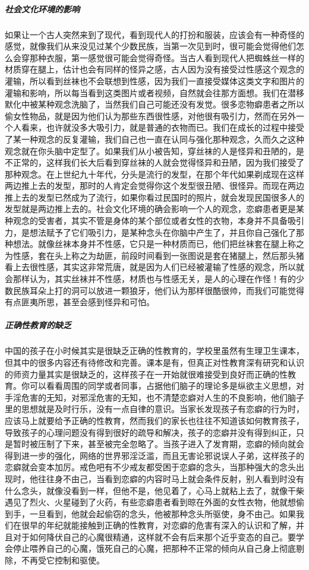 \subparagraph{社会文化环境的影响}

如果让一个古人突然来到了现代，看到现代人的打扮和服装，应该会有一种奇怪的感觉，就像我们从来没见过某个少数民族，当第一次见到时，很可能会觉得他们怎么会穿那种衣服，第一感觉很可能会觉得奇怪。当古人看到现代人把蜘蛛丝一样的材质穿在腿上，估计也会有同样的怪异之感，古人因为没有接受过性感这个观念的灌输，所以看到丝袜也不会联想到性感，因为我们一直接受媒体这类文字和图片的灌输和影响，所以每当看到这类图片或者视频，自然就会往那方面想。我们在潜移默化中被某种观念洗脑了，当然我们自己可能还没有发觉。很多恋物癖患者之所以偷女性物品，就是因为他们认为那些东西很性感，对他很有吸引力，然而在另外一个人看来，也许就没多大吸引力，就是普通的衣物而已。我们在成长的过程中接受了某一种观念的反复灌输，我们自己也一直在认同与强化那种观念，久而久之这种观念就在你头脑中定型了。如果我们从小被告知，穿丝袜的人是怪异和丑陋的，是不正常的，这样我们长大后看到穿丝袜的人就会觉得怪异和丑陋，因为我们接受了那种观念。在上世纪九十年代，分头是流行的发型，在那个年代如果剃成现在这样两边推上去的发型，那时的人肯定会觉得你这个发型很丑陋、很怪异。而现在两边推上去的发型已然成为了流行，如果你看过民国时的照片，就会发现民国很多人的发型就是两边推上去的。社会文化环境的确会影响一个人的观念，恋癖患者更是某种观念的受害者，其实不管是身体的某个部位或者女性的衣物，本身并不具备吸引力，是想法赋予了它们吸引力，是某种念头在你脑中产生了，并且你自己强化了那种想法。就像丝袜本身并不性感，它只是一种材质而已，他们把丝袜套在腿上称之为性感，套在头上称之为劫匪，前段时间看到一张图说是套在猪腿上，然后那头猪看上去很性感，其实这非常荒唐，就是因为人们已经被灌输了性感的观念，所以就会那样认为，其实丝袜并不性感，材质也与性感无关，是人的心理在作怪！有的少数民族耳朵上打的洞可以放进一颗狼牙，他们认为那样很酷很帅，而我们可能觉得有点匪夷所思，甚至会感到怪异和可怕。

\subparagraph{正确性教育的缺乏}

中国的孩子在小时候其实是很缺乏正确的性教育的，学校里虽然有生理卫生课本，但其中的很多内容还有待修改和完善。课本是有，但真正对性教育深有研究和认识的师资力量其实是很缺乏的，这样孩子在一开始就很难接受到良好而正确的性教育。你可以看看周围的同学或者同事，占据他们脑子的理论多是纵欲主义思想，对手淫危害的无知，对邪淫危害的无知，也不清楚恋癖对人生的不良影响，他们脑子里的思想就是及时行乐，没有一点自律的意识。当家长发现孩子有恋癖的行为时，应该马上就要给予正确的性教育，然而我们的家长也往往不知道该如何教育孩子，导致孩子的心理问题没有得到很好的疏导和解决，孩子的恋癖并没有得到纠正，只是暂时被压制了下来，甚至被完全忽略了。当孩子进入了发育期，恋癖的倾向就会得到进一步的强化，网络的世界邪淫泛滥，而且无害论邪说误人子弟，这样孩子的恋癖就会变本加厉。戒色吧有不少戒友都受困于恋癖的念头，当那种强大的念头出现时，他往往身不由己，当看到恋癖的内容时马上就会条件反射，别人看到时没有什么念头，就像没看到一样，但他不是，他见着了，心马上就粘上去了，就像干柴遇见了烈火、火星碰到了火药，有些恋癖患者看到晾在外面的女性衣物，他就想偷到手，一旦看到，他就会起偷窃的念头，他被那种念头所驱使，身不由己。如果我们在很早的年纪就能接触到正确的性教育，对恋癖的危害有深入的认识和了解，并且对于如何降伏自己的心魔很精通，这样就不会有后来那个近乎变态的自己。要学会停止喂养自己的心魔，饿死自己的心魔，把那种不正常的倾向从自己身上彻底剔除，不再受它控制和驱使。


